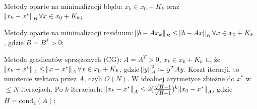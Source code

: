 \entry
Metody oparte na minimalizacji błędu:
$x_k\in x_0 +K_k$ oraz $\norm{x_k - x^*}_B \forall x\in x_0 + K_k$;

\entry
Metody oparte na minimalizacji residuum:
$\norm{b-Ax_k}_B \leq \norm{b-Ax}_B \forall x\in x_0 +K_k$, gdzie $B=B^T>0$;

\entry
Metoda gradientów sprzężonych (CG):
$A=A^T>0$, $x_k\in x_0 + K_k$ t.,
że $\norm{x_k+x^*}_A\leq \norm{x-x^*}_A \forall x\in x_0 + K_k$,
gdzie $\norm{y}^2_A \coloneqq y^TAy$.
Koszt iteracji, to mnożenie wektora przez $A$, czyli $O(N)$.
W idealnej arytmetyce zbieżne do $x^*$ w $\leq N$ iteracjach.
Po $k$ iteracjach:
$\norm{x_k - x^*}_A\leq 2(\frac{\sqrt{H} - 1}{\sqrt{H} + 1})^k\norm{x_0-x^*}_A$,
gdzie $H=\mathrm{cond}_2(A)$;


